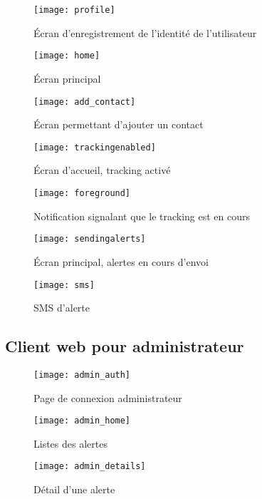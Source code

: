 \begin{figure}[H]
	\centering
	\texttt{[image: profile]}
	\caption{Écran d’enregistrement de l’identité de l’utilisateur}
\end{figure}

\begin{figure}[H]
	\centering
	\texttt{[image: home]}
	\caption{Écran principal}
\end{figure}

\begin{figure}[H]
	\centering
	\texttt{[image: add\_contact]}
	\caption{Écran permettant d’ajouter un contact}
\end{figure}

\begin{figure}[H]
	\centering
	\texttt{[image: trackingenabled]}
	\caption{Écran d'accueil, tracking activé}
\end{figure}

\begin{figure}[H]
	\centering
	\texttt{[image: foreground]}
	\caption{Notification signalant que le tracking est en cours}
\end{figure}

\begin{figure}[H]
	\centering
	\texttt{[image: sendingalerts]}
	\caption{Écran principal, alertes en cours d’envoi}
\end{figure}

\begin{figure}[H]
	\centering
	\texttt{[image: sms]}
	\caption{SMS d’alerte}
\end{figure}

\subsection{Client web pour administrateur}

\begin{figure}[H]
	\centering
	\texttt{[image: admin\_auth]}
	\caption{Page de connexion administrateur}
\end{figure}

\begin{figure}[H]
	\centering
	\texttt{[image: admin\_home]}
	\caption{Listes des alertes}
\end{figure}

\begin{figure}[H]
	\centering
	\texttt{[image: admin\_details]}
	\caption{Détail d’une alerte}
\end{figure}

